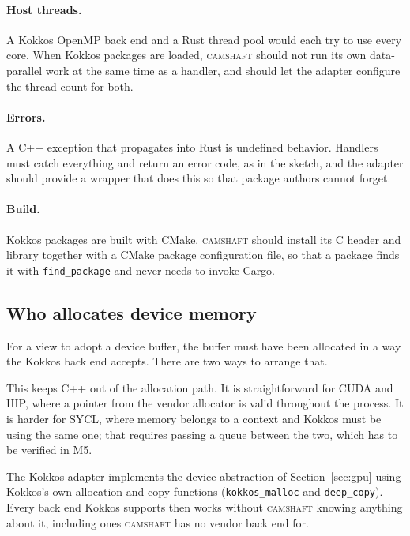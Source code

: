 \documentclass[11pt,a4paper]{article}
\newcommand{\camshaft}{\textsc{camshaft}}
\newcommand{\code}[1]{\texttt{#1}}
\begin{document}
\paragraph{Host threads.}  A Kokkos OpenMP back end and a Rust thread pool
would each try to use every core.  When Kokkos packages are loaded, \camshaft{}
should not run its own data-parallel work at the same time as a handler, and
should let the adapter configure the thread count for both.

\paragraph{Errors.}  A C++ exception that propagates into Rust is undefined
behavior.  Handlers must catch everything and return an error code, as in
the sketch, and the adapter should provide a wrapper that does this so that
package authors cannot forget.

\paragraph{Build.}  Kokkos packages are built with CMake.  \camshaft{} should
install its C header and library together with a CMake package configuration
file, so that a package finds it with \code{find\_package} and never needs to
invoke Cargo.

\subsection{Who allocates device memory}
\label{sec:kokkos-memory}

For a view to adopt a device buffer, the buffer must have been allocated in a
way the Kokkos back end accepts.  There are two ways to arrange that.

\begin{description}[style=nextline,leftmargin=2em]
  \item[The store allocates through the vendor runtime; Kokkos adopts.]
        This keeps C++ out of the allocation path.  It is straightforward for
        CUDA and HIP, where a pointer from the vendor allocator is valid
        throughout the process.  It is harder for SYCL, where memory belongs
        to a context and Kokkos must be using the same one; that requires
        passing a queue between the two, which has to be verified in M5.
  \item[Kokkos allocates; the store records.]
        The Kokkos adapter implements the device abstraction of
        Section~\ref{sec:gpu} using Kokkos's own allocation and copy
        functions (\code{kokkos\_malloc} and \code{deep\_copy}).  Every back end Kokkos supports then works
        without \camshaft{} knowing anything about it, including ones \camshaft{} has
        no vendor back end for.
\end{description}
\end{document}
